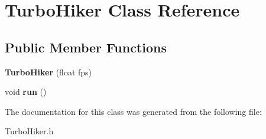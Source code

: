 \hypertarget{classTurboHiker}{}\section{Turbo\+Hiker Class Reference}
\label{classTurboHiker}
\subsection*{Public Member Functions}
\begin{DoxyCompactItemize}
\item 
\mbox{\label{classTurboHiker_afcd90c00a28da42a494c850ca1bcc57f}} 
{\bfseries Turbo\+Hiker} (float fps)
\item 
\mbox{\label{classTurboHiker_aba075b3c3bcec452730826893ba60c87}} 
void {\bfseries run} ()
\end{DoxyCompactItemize}


The documentation for this class was generated from the following file\+:\begin{DoxyCompactItemize}
\item 
Turbo\+Hiker.\+h\end{DoxyCompactItemize}
